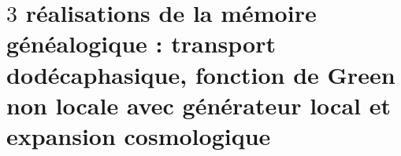 \chapter{\texorpdfstring{\(3\)}{3} réalisations de la mémoire généalogique : transport dodécaphasique, fonction de Green non locale avec générateur local et expansion cosmologique}
\label{chap:md-memoria-tres-realizaciones}
\begingroup
\let\HMTOwnerSection\section
\let\HMTOwnerSubsection\subsection
\let\HMTOwnerSubsubsection\subsubsection
\let\HMTOwnerParagraph\paragraph
\let\chapter\HMTOwnerSection
\let\section\HMTOwnerSubsection
\let\subsection\HMTOwnerSubsubsection
\let\subsubsection\HMTOwnerParagraph

\endgroup

\begingroup
\def\HMTDesiredChapterTitle{Descente icosaédrique \texorpdfstring{\(A_5/C_5\)}{A5/C5} et sélection du porteur gravitationnel à cinq composantes}%
\let\HMTOriginalChapter\chapter
\renewcommand{\chapter}[2][]{\HMTOriginalChapter{\HMTDesiredChapterTitle}}%

\endgroup


